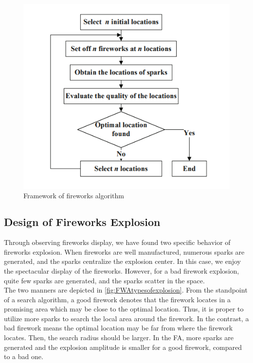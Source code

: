 \documentclass[11pt, a4paper]{report}
\begin{document}
\newpage
	\begin{figure}[!bth]
	\center
	\includegraphics[scale=0.5]{images/FA_flowchart.png}
	\caption[Framework of fireworks algorithm]{Framework of fireworks algorithm \cite{paper:fwa}}
	\label{fig:FAFramework}
	\end{figure}

\subsection{Design of Fireworks Explosion}
Through observing fireworks display, we have found two specific behavior of
fireworks explosion. When fireworks are well manufactured, numerous sparks are
generated, and the sparks centralize the explosion center. In this case, we enjoy
the spectacular display of the fireworks. However, for a bad firework explosion,
quite few sparks are generated, and the sparks scatter in the space. \\

The two manners are depicted in \ref{fig:FWAtypesofexplosion}. From the standpoint of a search
algorithm, a good firework denotes that the firework locates in a promising area
which may be close to the optimal location. Thus, it is proper to utilize more
sparks to search the local area around the firework. In the contrast, a bad firework
means the optimal location may be far from where the firework locates. Then,
the search radius should be larger. In the FA, more sparks are generated and
the explosion amplitude is smaller for a good firework, compared to a bad one.
\end{document}
